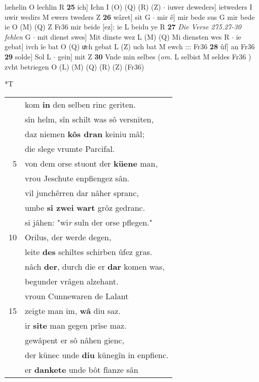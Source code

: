 \documentclass[8pt,a4paper,notitlepage]{article}
\begin{document}
\begin{table}[ht]
\begin{minipage}[t]{0.5\linewidth}
læhelin O lechlin R \textbf{25} ich] Ichn I (O) (Q) (R) (Z)  $\cdot$ iuwer deweders] ietweders I uwir wedirs M ewers tweders Z \textbf{26} wâret] sit G  $\cdot$ mir ê] mir bede sus G mir bede ie O (M) (Q) Z Fr36 mir beide [ez]: ie L beidu ye R \textbf{27} \textit{Die Verse 275.27-30 fehlen} G   $\cdot$ mit dienst swes] Mit dinste wez L (M) (Q) Mi diensten wes R  $\cdot$ ie gebat] ivch îe bat O (Q) uͯch gebat L (Z) uch bat M ewch ::: Fr36 \textbf{28} ûf] an Fr36 \textbf{29} solde] Sol L  $\cdot$ gein] mit Z \textbf{30} Vnde min selbes (\textit{om.} L selbist M seldes Fr36 ) zvht betriegen O (L) (M) (Q) (R) (Z) (Fr36) \newline
\end{minipage}
\hspace{0.5cm}
\begin{minipage}[t]{0.5\linewidth}
\small
\begin{center}*T
\end{center}
\begin{tabular}{rl}
 & kom \textbf{in} den selben rinc geriten.\\ 
 & sîn helm, sîn schilt was sô versniten,\\ 
 & daz niemen \textbf{kôs dran} keiniu mâl;\\ 
 & die slege vrumte Parcifal.\\ 
5 & von dem orse stuont der \textbf{küene} man,\\ 
 & vrou Jeschute enpfiengez sân.\\ 
 & vil junchêrren dar nâher spranc,\\ 
 & umbe \textbf{si zwei} \textbf{wart} grôz gedranc.\\ 
 & si jâhen: "wi\textit{r} suln der orse pflegen."\\ 
10 & Orilus, der werde degen,\\ 
 & leite \textbf{des} schiltes schirben ûfez gras.\\ 
 & nâch \textbf{der}, durch die er \textbf{dar} komen was,\\ 
 & begunder vrâgen alzehant.\\ 
 & vroun Cunnewaren de Lalant\\ 
15 & zeigte man im, \textbf{wâ} diu saz.\\ 
 & ir \textbf{site} man gegen prîse maz.\\ 
 & gewâpent er sô nâhen gienc,\\ 
 & der künec unde \textbf{diu} künegîn in enpfienc.\\ 
 & er \textbf{dankete} unde bôt fîanze sân\\ 

\end{tabular}
\end{minipage}
\end{table}
\end{document}
